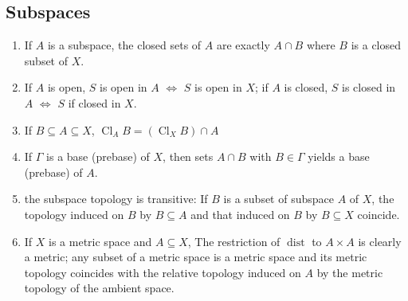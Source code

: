 \documentclass{article}
\DeclareMathOperator{\Cl}{Cl}
\DeclareMathOperator{\dist}{dist}
\begin{document}
\subsection{Subspaces}
\begin{enumerate}
\item If \(A\) is a subspace, the closed sets of \(A\) are exactly \(A\cap B\) where \(B\) is a closed subset of \(X\).
\item If \(A\) is open, \(S\) is open in \(A\) \(\Longleftrightarrow\) \(S\) is open in \(X\); if \(A\) is closed, \(S\) is closed in \(A\) \(\Longleftrightarrow\) \(S\) if closed in \(X\).
\item If \(B\subseteq A\subseteq X\), \(\Cl_{A}B=(\Cl_{X}B)\cap A\)
\item If \(\Gamma\) is a base (prebase) of \(X\), then sets \(A\cap B\) with \(B\in\Gamma\) yields a base (prebase) of \(A\).
\item the subspace topology is transitive: If \(B\) is a subset of subspace \(A\) of \(X\), the topology induced on \(B\) by \(B\subseteq A\) and that induced on \(B\) by \(B\subseteq X\) coincide.
\item If \(X\) is a metric space and \(A\subseteq X\), The restriction of \(\dist\) to \(A\times A\) is clearly a metric; any subset of a metric space is a metric space and its metric topology 
coincides with the relative topology induced on \(A\) by the metric topology of the ambient space.
\end{enumerate}
\end{document}
